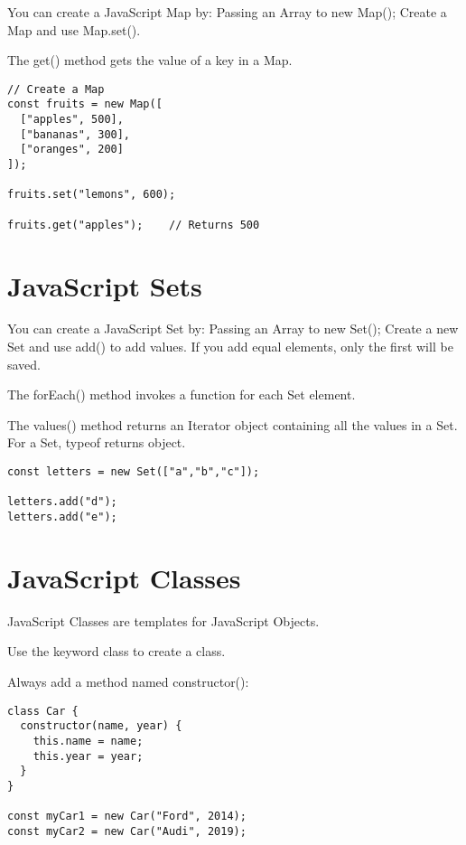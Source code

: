 \documentclass[a4paper,12pt]{article}
\begin{document}
\begin{large}
You can create a JavaScript Map by: Passing an Array to new Map(); 
Create a Map and use Map.set().

The get() method gets the value of a key in a Map.

\begin{lstlisting}
// Create a Map
const fruits = new Map([
  ["apples", 500],
  ["bananas", 300],
  ["oranges", 200]
]);

fruits.set("lemons", 600);

fruits.get("apples");    // Returns 500
\end{lstlisting}





\section*{JavaScript Sets}

You can create a JavaScript Set by: Passing an Array to new Set(); Create a new Set and use add() to add values. If you add equal elements, only the first will be saved.

The forEach() method invokes a function for each Set element.

The values() method returns an Iterator object containing all the values in a Set. For a Set, typeof returns object.

\begin{lstlisting}
const letters = new Set(["a","b","c"]);

letters.add("d");
letters.add("e");

\end{lstlisting}






\section*{JavaScript Classes}

JavaScript Classes are templates for JavaScript Objects.

Use the keyword class to create a class.

Always add a method named constructor():

\begin{lstlisting}
class Car {
  constructor(name, year) {
    this.name = name;
    this.year = year;
  }
}

const myCar1 = new Car("Ford", 2014);
const myCar2 = new Car("Audi", 2019);
\end{lstlisting}







\end{large}
\end{document}
